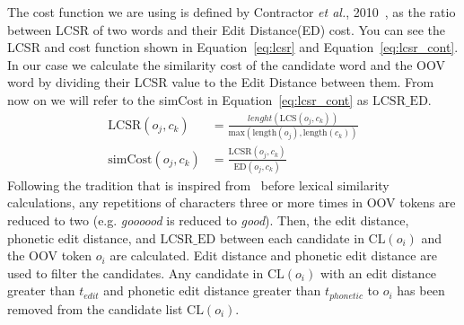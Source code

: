 \documentclass[a4paper,onesided,12pt]{report}
\begin{document}
The cost function we are using is defined by Contractor \textit{et al.}, 2010~\cite{Contractor:2010:UCN:1944566.1944588}, as the ratio between LCSR of two words and their Edit Distance(ED) cost. You can see the LCSR and cost function shown in Equation~\ref{eq:lcsr} and Equation~\ref{eq:lcsr_cont}. In our case we calculate the similarity cost of the candidate word and the OOV word by dividing their LCSR value to the Edit Distance between them. From now on we will refer to the simCost in Equation~\ref{eq:lcsr_cont} as $\text{LCSR\_ED}$.
\begin{align}
\text{LCSR}(o_j,c_k) &= \frac{lenght(\text{LCS}(o_j,c_k))}{\text{max}(\text{length}(o_j),\text{length}(c_k))} \label{eq:lcsr}      \\
\text{simCost} (o_j,c_k) &= \frac{\text{LCSR}(o_j,c_k)}{\text{ED}(o_j,c_k)} \label{eq:lcsr_cont}
\end{align}
Following the tradition that is inspired from~\cite{Kaufmann2010} before lexical similarity calculations, any repetitions of characters three or more times in OOV tokens are reduced to two (e.g. \emph{goooood} is reduced to \emph{good}). Then, the edit distance, phonetic edit distance, and $\text{LCSR\_ED}$ between each candidate in $\text{CL}(o_{i})$ and the OOV token $o_i$ are calculated. Edit distance and phonetic edit distance are used to filter the candidates. Any candidate in $\text{CL}(o_{i})$ with an edit distance greater than $t_{edit}$ and phonetic edit distance greater than $t_{phonetic}$ to $o_i$ has been removed from the candidate list $\text{CL}(o_{i})$.
\end{document}
